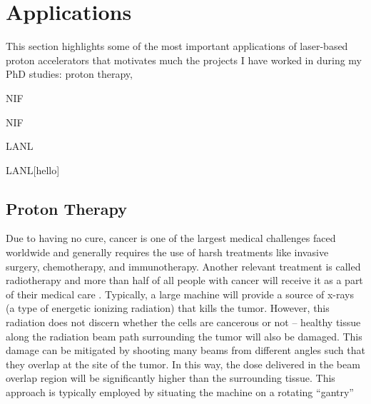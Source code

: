 \section{Applications}

This section highlights some of the most important applications of laser-based proton accelerators that motivates much the projects I have worked in during my PhD studies: proton therapy, 

\acrfull{NIF}

\acrshort{NIF}

\acrfull{LANL}


\acrshort{LANL}[hello]

\subsection{Proton Therapy}

Due to having no cure, cancer is one of the largest medical challenges faced worldwide and generally requires the use of harsh treatments like invasive surgery, chemotherapy, and immunotherapy. Another relevant treatment is called radiotherapy and more than half of all people with cancer will receive it as a part of their medical care \cite{Mayo_2024_Cancer}. Typically, a large machine will provide a source of x-rays (a type of energetic ionizing radiation) that kills the tumor. However, this radiation does not discern whether the cells are cancerous or not -- healthy tissue along the radiation beam path surrounding the tumor will also be damaged. This damage can be mitigated by shooting many beams from different angles such that they overlap at the site of the tumor. In this way, the dose delivered in the beam overlap region will be significantly higher than the surrounding tissue. This approach is typically employed by situating the machine on a rotating ``gantry''

